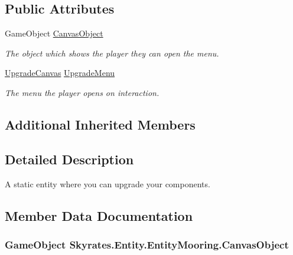 \subsection*{Public Attributes}
\begin{DoxyCompactItemize}
\item 
Game\-Object \hyperlink{class_skyrates_1_1_entity_1_1_entity_mooring_a87613aedbca78338b0b975d8f7fbf151}{Canvas\-Object}
\begin{DoxyCompactList}\small\item\em The object which shows the player they can open the menu. \end{DoxyCompactList}\item 
\hyperlink{class_skyrates_1_1_u_i_1_1_upgrade_canvas}{Upgrade\-Canvas} \hyperlink{class_skyrates_1_1_entity_1_1_entity_mooring_afea86c223b57c927c31d9b16201841fc}{Upgrade\-Menu}
\begin{DoxyCompactList}\small\item\em The menu the player opens on interaction. \end{DoxyCompactList}\end{DoxyCompactItemize}
\subsection*{Additional Inherited Members}


\subsection{Detailed Description}
A static entity where you can upgrade your components. 



\subsection{Member Data Documentation}
\hypertarget{class_skyrates_1_1_entity_1_1_entity_mooring_a87613aedbca78338b0b975d8f7fbf151}{
\subsubsection[{Canvas\-Object}]{\setlength{\rightskip}{0pt plus 5cm}Game\-Object Skyrates.\-Entity.\-Entity\-Mooring.\-Canvas\-Object}}\label{class_skyrates_1_1_entity_1_1_entity_mooring_a87613aedbca78338b0b975d8f7fbf151}


